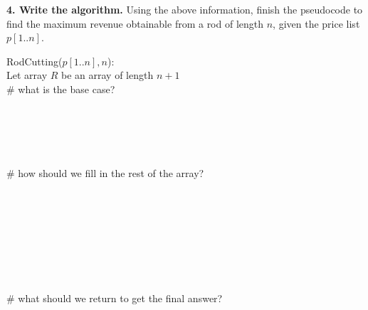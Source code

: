 \documentclass[11pt]{article}
\begin{document}
\begin{enumerate}
    \textbf{4. Write the algorithm.} Using the above information, finish the pseudocode
    to find the maximum revenue obtainable from a rod of length $n$, given the
    price list $p[1..n]$.
    \begin{algo}
    RodCutting($p[1..n], n$):\+\\
    Let array $R$ be an array of length $n+1$\\
    \# what is the base case?\\
    \\
    \\
    \\
    \\
    \\
    \# how should we fill in the rest of the array?\\
    \\
    \\
    \\
    \\
    \\
    \\
    \\
    \\
    \# what should we return to get the final answer?\\
    \\
    \\
    \\
    \hspace{5in}
    \end{algo}




\end{enumerate}
\end{document}

